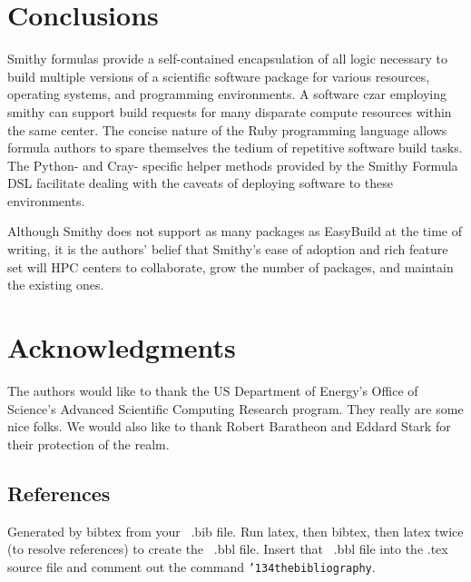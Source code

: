 \documentclass{acm_proc_article-sp}
\begin{document}
\section{Conclusions}
Smithy formulas provide a self-contained encapsulation of all logic necessary to
build multiple versions of a scientific software package for various resources,
operating systems, and programming environments. A software czar employing
smithy can support build requests for many disparate compute resources within
the same center. The concise nature of the Ruby programming language allows
formula authors to spare themselves the tedium of repetitive software build
tasks. The Python- and Cray- specific helper methods provided by the Smithy
Formula DSL facilitate dealing with the caveats of deploying software to these
environments.

Although Smithy does not support as many packages as EasyBuild at the time of
writing, it is the authors' belief that Smithy's ease of adoption and rich
feature set will HPC centers to collaborate, grow the number of packages, and
maintain the existing ones.

\section{Acknowledgments}
The authors would like to thank the US Department of Energy's Office of
Science's Advanced Scientific Computing Research program. They really are some
nice folks. We would also like to thank Robert Baratheon and Eddard Stark for
their protection of the realm.

%


\subsection{References}
Generated by bibtex from your ~.bib file.  Run latex,
then bibtex, then latex twice (to resolve references)
to create the ~.bbl file.  Insert that ~.bbl file into
the .tex source file and comment out
the command \texttt{{\char'134}thebibliography}.
\end{document}
